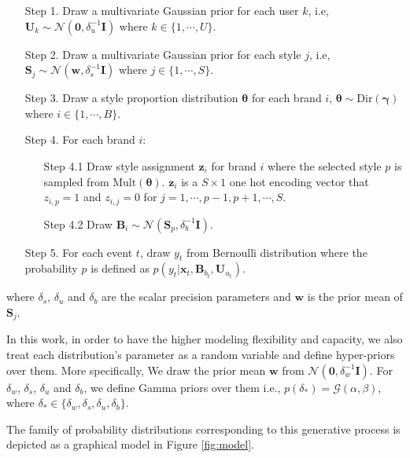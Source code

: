 \begin{enumerate}
\item[Step 1.] Draw a multivariate Gaussian prior for each user $k$, i.e, $\mathbf{U}_k \sim \mathcal{N}(\mathbf{0}, \delta_u^{-1}\mathbf{I})$ where $k \in \{1, \cdots, U\}$.

\item[Step 2.] Draw a multivariate Gaussian prior for each style $j$, i.e, $\mathbf{S}_j \sim \mathcal{N}(\mathbf{w}, \delta_s^{-1}\mathbf{I})$ where $j \in \{1, \cdots, S\}$.

\item[Step 3.] Draw a style proportion distribution $\boldsymbol{\theta}$ for each brand $i$, $\boldsymbol{\theta} \sim \mbox{Dir}(\boldsymbol{\gamma})$  where $i \in \{1, \cdots, B\}$.

\item[Step 4.] For each brand $i$:
	\begin{enumerate}
		\item[Step 4.1] Draw style assignment $\mathbf{z}_i$ for brand $i$ where the selected style $p$ is sampled from $\mbox{Mult}(\boldsymbol{\theta})$. $\mathbf{z}_i$ is a $S\times1$ one hot encoding vector that $z_{i,p} = 1$ and $z_{i,j} = 0$ for $j = 1, \cdots, p-1, p+1, \cdots, S$.
		\item[Step 4.2] Draw $\mathbf{B}_i \sim \mathcal{N}(\mathbf{S}_{p}, \delta_b^{-1}\mathbf{I})$.
	\end{enumerate}

\item[Step 5.] For each event $t$, draw $y_t$ from Bernoulli distribution where the probability $p$ is defined as $p(y_t|\mathbf{x}_t, \mathbf{B}_{b_t}, \mathbf{U}_{u_t})$.
\end{enumerate}

\noindent where $\delta_s$, $\delta_u$ and $\delta_b$ are the scalar precision parameters and $\mathbf{w}$ is the prior mean of $\mathbf{S}_j$. 

In this work, in order to have the higher modeling flexibility and capacity, we also treat each distribution's parameter as a random variable and define hyper-priors over them. More specifically, We draw the prior mean $\mathbf{w}$ from $\mathcal{N}(\mathbf{0}, \delta_w^{-1}\mathbf{I})$. For $\delta_w$, $\delta_s$, $\delta_u$ and $\delta_b$, we define Gamma priors over them i.e.,  $p(\delta_*) = \mathcal{G}(\alpha, \beta)$, where $\delta_* \in \{ \delta_w, \delta_s, \delta_u, \delta_b \}$. 

The family of probability distributions corresponding to this generative process is depicted as a graphical model in Figure \ref{fig:model}.

